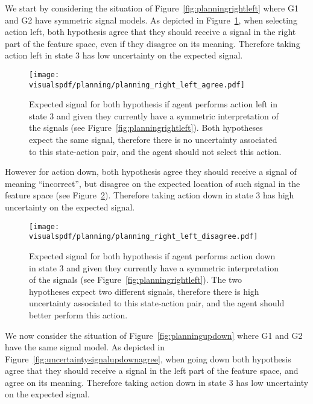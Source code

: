 We start by considering the situation of Figure~\ref{fig:planningrightleft} where G1 and G2 have symmetric signal models. As depicted in Figure~\ref{fig:uncertaintysignalrightleftagree}, when selecting action left, both hypothesis agree that they should receive a signal in the right part of the feature space, even if they disagree on its meaning. Therefore taking action left in state 3 has low uncertainty on the expected signal.

\begin{figure}[!htbp]
  \centering
  \texttt{[image: \\visualspdf/planning/planning\_right\_left\_agree.pdf]}
  \caption{Expected signal for both hypothesis if agent performs action left in state 3 and given they currently have a symmetric interpretation of the signals (see Figure~\ref{fig:planningrightleft}). Both hypotheses expect the same signal, therefore there is no uncertainty associated to this state-action pair, and the agent should not select this action.}
  \label{fig:uncertaintysignalrightleftagree}
\end{figure}

However for action down, both hypothesis agree they should receive a signal of meaning ``incorrect'', but disagree on the expected location of such signal in the feature space (see Figure~\ref{fig:uncertaintysignalrightleftdisagree}). Therefore taking action down in state 3 has high uncertainty on the expected signal.

\begin{figure}[!htbp]
  \centering
  \texttt{[image: \\visualspdf/planning/planning\_right\_left\_disagree.pdf]}
  \caption{Expected signal for both hypothesis if agent performs action down in state 3 and given they currently have a symmetric interpretation of the signals (see Figure~\ref{fig:planningrightleft}). The two hypotheses expect two different signals, therefore there is high uncertainty associated to this state-action pair, and the agent should better perform this action.}
  \label{fig:uncertaintysignalrightleftdisagree}
\end{figure}

We now consider the situation of Figure~\ref{fig:planningupdown} where G1 and G2 have the same signal model. As depicted in Figure~\ref{fig:uncertaintysignalupdownagree}, when going down both hypothesis agree that they should receive a signal in the left part of the feature space, and agree on its meaning. Therefore taking action down in state 3 has low uncertainty on the expected signal.

